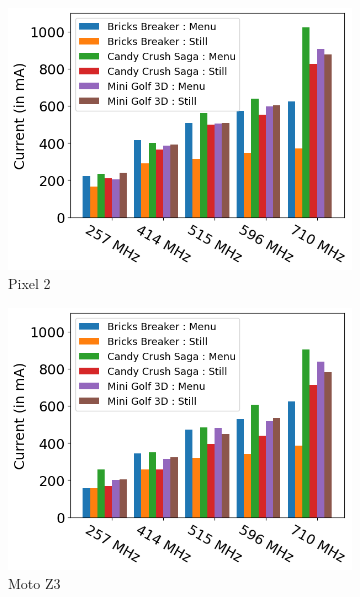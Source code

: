 \begin{figure}[tp]
    \centering
     \begin{subfigure}[b]{0.32\textwidth}
         \centering
         \includegraphics[width=\textwidth]{figures/002_Pixel2_gpu_model.png}
         \caption{Pixel 2}
         \label{fig:gpu_model_p2}
     \end{subfigure}
    \begin{subfigure}[b]{0.32\textwidth}
         \centering
         \includegraphics[width=\textwidth]{figures/003_MotoZ3_gpu_model.png}
         \caption{Moto Z3}
         \label{fig:gpu_model_z3}
     \end{subfigure}
    \begin{subfigure}[b]{0.32\textwidth}

\end{subfigure}
\end{figure}
